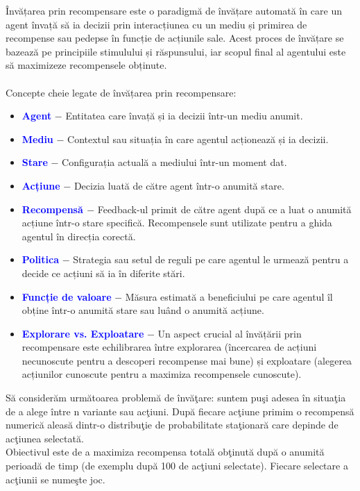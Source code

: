 \documentclass{article}
\begin{document}
Învățarea prin recompensare este o paradigmă de învățare automată în care un agent învață să ia decizii prin interacțiunea cu un mediu și primirea de recompense sau pedepse în funcție de acțiunile sale. Acest proces de învățare se bazează pe principiile stimulului și răspunsului, iar scopul final al agentului este să maximizeze recompensele obținute.\\\\
Concepte cheie legate de învățarea prin recompensare:
\begin{itemize}
      \item \textbf{\textcolor{blue}{Agent}} $-$ Entitatea care învață și ia decizii într-un mediu anumit.
      \item \textbf{\textcolor{blue}{Mediu}} $-$ Contextul sau situația în care agentul acționează și ia decizii.
      \item \textbf{\textcolor{blue}{Stare}} $-$ Configurația actuală a mediului într-un moment dat.
      \item \textbf{\textcolor{blue}{Acțiune}} $-$ Decizia luată de către agent într-o anumită stare.
      \item \textbf{\textcolor{blue}{Recompensă }} $-$ Feedback-ul primit de către agent după ce a luat o anumită acțiune într-o stare specifică. Recompensele sunt utilizate pentru a ghida agentul în direcția corectă.
      \item \textbf{\textcolor{blue}{Politica}} $-$ Strategia sau setul de reguli pe care agentul le urmează pentru a decide ce acțiuni să ia în diferite stări.
      \item \textbf{\textcolor{blue}{Funcție de valoare}} $-$ Măsura estimată a beneficiului pe care agentul îl obține într-o anumită stare sau luând o anumită acțiune.
      \item \textbf{\textcolor{blue}{Explorare vs. Exploatare}} $-$ Un aspect crucial al învățării prin recompensare este echilibrarea între explorarea (încercarea de acțiuni necunoscute pentru a descoperi recompense mai bune) și exploatare (alegerea acțiunilor cunoscute pentru a maximiza recompensele cunoscute).\\
\end{itemize}
Să considerăm următoarea problemă de învăţare: suntem puşi adesea în situaţia de a alege  între n variante  sau acţiuni. După fiecare acţiune primim o recompensă numerică aleasă dintr-o distribuţie de probabilitate staţionară care depinde de acţiunea selectată. \\
Obiectivul este de a maximiza recompensa totală obţinută după o anumită perioadă de timp (de exemplu după 100 de acţiuni selectate). Fiecare selectare a acţiunii se numeşte joc. \\\\
\end{document}
